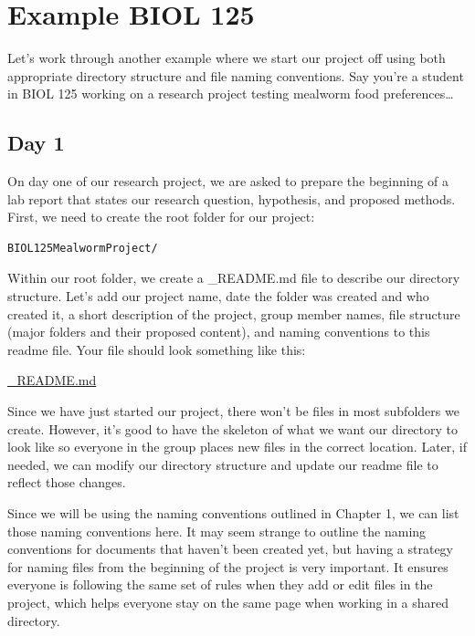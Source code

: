 \documentclass[
]{book}
\begin{document}
\hypertarget{example-biol-125}{%
\section{Example BIOL 125}\label{example-biol-125}}

Let's work through another example where we start our project off using both appropriate directory structure and file naming conventions. Say you're a student in BIOL 125 working on a research project testing mealworm food preferences\ldots{}

\hypertarget{day-1-1}{%
\subsection*{Day 1}\label{day-1-1}}

On day one of our research project, we are asked to prepare the beginning of a lab report that states our research question, hypothesis, and proposed methods. First, we need to create the root folder for our project:

\begin{verbatim}
BIOL125MealwormProject/
\end{verbatim}

Within our root folder, we create a \_README.md file to describe our directory structure. Let's add our project name, date the folder was created and who created it, a short description of the project, group member names, file structure (major folders and their proposed content), and naming conventions to this readme file. Your file should look something like this:

\href{files/DS_biol-125-readme_V0.md}{\_README.md}

Since we have just started our project, there won't be files in most subfolders we create. However, it's good to have the skeleton of what we want our directory to look like so everyone in the group places new files in the correct location. Later, if needed, we can modify our directory structure and update our readme file to reflect those changes.

Since we will be using the naming conventions outlined in Chapter 1, we can list those naming conventions here. It may seem strange to outline the naming conventions for documents that haven't been created yet, but having a strategy for naming files from the beginning of the project is very important. It ensures everyone is following the same set of rules when they add or edit files in the project, which helps everyone stay on the same page when working in a shared directory.
\end{document}
